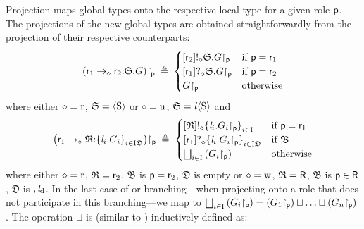 Projection maps global types onto the respective local type for a given role $ \Role[p] $.
The projections of the new global types are obtained straightforwardly from the projection of their respective \strongR counterparts:
\begin{align*}
	\Proj{\left( \Role_1 \to_{\diamond} \Role_2{:}{\mathfrak{S}}.\GT \right)}{\Role[p]} \deff
	\begin{cases}
		{\left[ \Role_2 \right]}\mathsf{!}_{\diamond}{\mathfrak{S}}.{\Proj{\GT}{\Role[p]}} & \text{if } \Role[p] = \Role_1\\
		{\left[ \Role_1 \right]}\mathsf{?}_{\diamond}{\mathfrak{S}}.{\Proj{\GT}{\Role[p]}} & \text{if } \Role[p] = \Role_2\\
		\Proj{\GT}{\Role[p]} & \text{otherwise}
	\end{cases}
\end{align*}
where either $ \diamond = \iR $, $ \mathfrak{S} = {\left< \Sort \right>} $ or $ \diamond = \iU $, $ \mathfrak{S} = \Label{\left< \Sort \right>} $ and
\begin{align*}
	\Proj{\left( \Role_1 \to_{\diamond} \mathfrak{R}{:}{\Set{ \Label_i.\GT_i }_{i \in \indexSet \mathfrak{D}}} \right)}{\Role[p]} \deff
	\begin{cases}
		{\left[ \mathfrak{R} \right]}\mathsf{!}_{\diamond}{\Set{ \Label_i.\Proj{\GT_i}{\Role[p]} }_{i \in \indexSet}} & \text{if } \Role[p] = \Role_1\\
		{\left[ \Role_1 \right]}\mathsf{?}_{\diamond}{\Set{ \Label_i.\Proj{\GT_i}{\Role[p]} }_{i \in \indexSet \mathfrak{D}}} & \text{if } \mathfrak{B}\\
		\bigsqcup_{i \in \indexSet} \left( \Proj{\GT_i}{\Role[p]} \right) & \text{otherwise}
	\end{cases}
\end{align*}
where either $ \diamond = \iR $, $ \mathfrak{R} = \Role_2 $, $ \mathfrak{B} $ is $ \Role[p] = \Role_2 $, $ \mathfrak{D} $ is empty or $ \diamond = \iW $, $ \mathfrak{R} = \Role[R] $, $ \mathfrak{B} $ is $ \Role[p] \in \Role[R] $, $ \mathfrak{D} $ is $ , \LabelD $.
In the last case of \strongR or \weakR branching---when projecting onto a role that does not participate in this branching---we map to $ \bigsqcup_{i \in \indexSet} \left( \Proj{\GT_i}{\Role[p]} \right) = \left( \Proj{\GT_1}{\Role[p]} \right) \sqcup \ldots \sqcup \left( \Proj{\GT_n}{\Role[p]} \right) $.
The operation $ \sqcup $ is (similar to \cite{YoshidaDanielouBejleriHu10}) inductively defined as:
